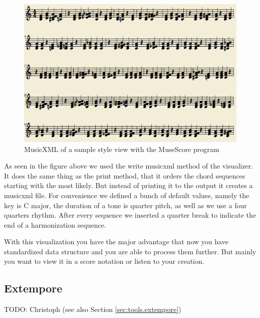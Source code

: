 \begin{figure}[ht]
\includegraphics[scale=.5]{Chapters/pic/xml_print.png}
\caption{MusicXML of a sample style view with the MuseScore program}
\end{figure}

As seen in the figure above we used the write musicxml method of the visualizer. It does the same thing as the print method, that it orders the chord sequences starting with the most likely. But instead of printing it to the output it creates a musicxml file. For convenience we defined a bunch of default values, namely the key is C major, the duration of a tone is quarter pitch, as well as we use a four quarters rhythm. After every sequence we inserted a quarter break to indicate the end of a harmonization sequence.

With this visualization you have the major advantage that now you have standardized data structure and you are able to process them further. But mainly you want to view it in a score notation or listen to your creation.

\subsection{Extempore}
\label{sec:viewers.extempore}

TODO: Christoph (see also Section \ref{sec:tools.extempore})